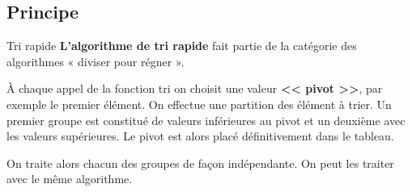 \subsection{Principe}

\begin{defi}{Tri rapide}
\textbf{L'algorithme de tri rapide} fait partie de la catégorie des algorithmes « diviser pour régner ».

À chaque appel de la fonction tri on choisit une valeur \textbf{<< pivot >>}, par exemple le premier élément. On effectue une partition des élément à trier. Un premier groupe est constitué de valeurs inférieures au pivot  et un deuxième avec les valeurs supérieures.
Le pivot est alors placé définitivement dans le tableau.

On traite alors chacun des groupes de façon indépendante. On peut les traiter avec le même algorithme.
\end{defi}

